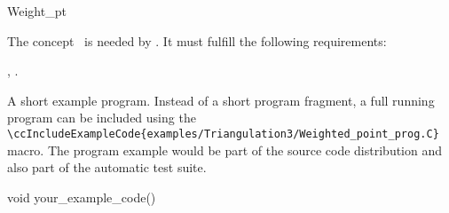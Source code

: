 

\begin{ccRefConcept}{Weight_pt}


\ccDefinition
  
The concept \ccRefName\ is needed by 
. 
It must fulfill the following requirements:

\ccTypes
{}
\ccGlue
{}
\ccGlue
{}

\ccCreation
{}


\ccAccessFunctions
{}

\ccHasModels


\ccSeeAlso

,
.

\ccExample

A short example program.
Instead of a short program fragment, a full running program can be
included using the 
\verb|\ccIncludeExampleCode{examples/Triangulation3/Weighted_point_prog.C}| 
macro. The program example would be part of the source code distribution and
also part of the automatic test suite.

\begin{ccExampleCode}
void your_example_code() {
}
\end{ccExampleCode}


\end{ccRefConcept}


